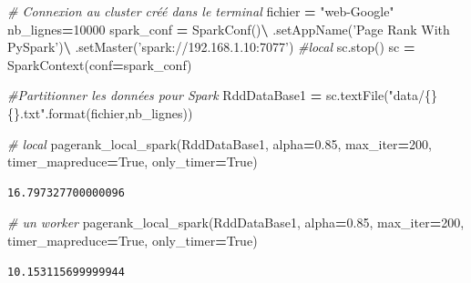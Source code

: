 \documentclass[10pt,a4paper]{article}
\newenvironment{Shaded}{\begin{snugshade}}{\end{snugshade}}
\newcommand{\BuiltInTok}[1]{#1}
\newcommand{\CommentTok}[1]{\textcolor[rgb]{0.56,0.35,0.01}{\textit{#1}}}
\newcommand{\DecValTok}[1]{\textcolor[rgb]{0.00,0.00,0.81}{#1}}
\newcommand{\FloatTok}[1]{\textcolor[rgb]{0.00,0.00,0.81}{#1}}
\newcommand{\NormalTok}[1]{#1}
\newcommand{\OperatorTok}[1]{\textcolor[rgb]{0.81,0.36,0.00}{\textbf{#1}}}
\newcommand{\SpecialCharTok}[1]{\textcolor[rgb]{0.00,0.00,0.00}{#1}}
\newcommand{\StringTok}[1]{\textcolor[rgb]{0.31,0.60,0.02}{#1}}
\newcommand{\VariableTok}[1]{\textcolor[rgb]{0.00,0.00,0.00}{#1}}
\theoremstyle{break}
\begin{document}
\begin{Shaded}
\begin{Highlighting}[]
\CommentTok{# Connexion au cluster créé dans le terminal}
\NormalTok{fichier }\OperatorTok{=} \StringTok{"web-Google"}
\NormalTok{nb_lignes}\OperatorTok{=}\DecValTok{10000}
\NormalTok{spark_conf }\OperatorTok{=}\NormalTok{ SparkConf()}\OperatorTok{\textbackslash{}}
\NormalTok{    .setAppName(}\StringTok{'Page Rank With PySpark'}\NormalTok{)}\OperatorTok{\textbackslash{}}
\NormalTok{    .setMaster(}\StringTok{'spark://192.168.1.10:7077'}\NormalTok{) }\CommentTok{#local}
\NormalTok{sc.stop()}
\NormalTok{sc }\OperatorTok{=}\NormalTok{ SparkContext(conf}\OperatorTok{=}\NormalTok{spark_conf)}

\CommentTok{#Partitionner les données pour Spark}
\NormalTok{RddDataBase1 }\OperatorTok{=}\NormalTok{ sc.textFile(}\StringTok{"data/}\SpecialCharTok{\{\}\{\}}\StringTok{.txt"}\NormalTok{.}\BuiltInTok{format}\NormalTok{(fichier,nb_lignes))}
\end{Highlighting}
\end{Shaded}

\begin{Shaded}
\begin{Highlighting}[]
\CommentTok{# local}
\NormalTok{pagerank_local_spark(RddDataBase1, alpha}\OperatorTok{=}\FloatTok{0.85}\NormalTok{, max_iter}\OperatorTok{=}\DecValTok{200}\NormalTok{,}
\NormalTok{                     timer_mapreduce}\OperatorTok{=}\VariableTok{True}\NormalTok{, only_timer}\OperatorTok{=}\VariableTok{True}\NormalTok{)}
\end{Highlighting}
\end{Shaded}

\begin{verbatim}
16.797327700000096
\end{verbatim}

\begin{Shaded}
\begin{Highlighting}[]
\CommentTok{# un worker}
\NormalTok{pagerank_local_spark(RddDataBase1, alpha}\OperatorTok{=}\FloatTok{0.85}\NormalTok{, max_iter}\OperatorTok{=}\DecValTok{200}\NormalTok{,}
\NormalTok{                     timer_mapreduce}\OperatorTok{=}\VariableTok{True}\NormalTok{, only_timer}\OperatorTok{=}\VariableTok{True}\NormalTok{)}
\end{Highlighting}
\end{Shaded}

\begin{verbatim}
10.153115699999944
\end{verbatim}
\end{document}
